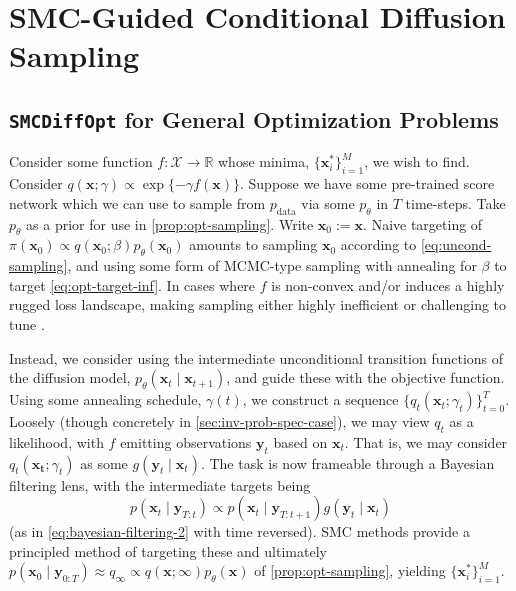 \chapter{SMC-Guided Conditional Diffusion Sampling} \label{chap:methods}

\section{\texttt{SMCDiffOpt} for General Optimization Problems} \label{sec:gen-opt}

Consider some function $f: \mathcal{X} \to \mathbb{R}$ whose minima, $\{\mathbf{x}^*_i\}_{i=1}^M$,
we wish to find. Consider $q(\mathbf{x}; \gamma) \propto \exp\{-\gamma f(\mathbf{x})\}$. Suppose we
have some pre-trained score network which we can use to sample from $p_{\text{data}}$ via some
$p_\theta$ in $T$ time-steps. Take $p_\theta$ as a prior for use in  \autoref{prop:opt-sampling}. Write
$\mathbf{x}_0 := \mathbf{x}$. Naive targeting of
$\pi(\mathbf{x}_0) \propto q(\mathbf{x}_0; \beta)p_\theta(\mathbf{x}_0)$ amounts to sampling
$\mathbf{x}_0$ according to \autoref{eq:uncond-sampling}, and using some form of MCMC-type sampling with
annealing for $\beta$ to target \autoref{eq:opt-target-inf}. In cases where $f$ is non-convex and/or
induces a highly rugged loss landscape, making sampling either highly inefficient or challenging
to tune \parencite{kongDiffusionModelsConstrained2024}.

Instead, we consider using the intermediate unconditional transition functions of the diffusion
model, $p_\theta(\mathbf{x}_{t} \mid \mathbf{x}_{t+1})$, and guide these with the objective
function. Using some annealing schedule, $\gamma(t)$, we construct a sequence
$\{q_t(\mathbf{x}_t; \gamma_t)\}_{t=0}^T$. Loosely (though concretely in
\autoref{sec:inv-prob-spec-case}), we may view $q_t$ as a likelihood, with $f$ emitting observations
$\mathbf{y}_t$ based on $\mathbf{x}_t$. That is, we may consider $q_t(\mathbf{x_t}; \gamma_t)$
as some $g(\mathbf{y}_t \mid \mathbf{x}_t)$. The task is now frameable through a Bayesian filtering
lens, with the intermediate targets being
\begin{equation}
    p(\mathbf{x}_t \mid \mathbf{y}_{T:t}) \propto p(\mathbf{x}_t \mid \mathbf{y}_{T:t+1})g(\mathbf{y}_t \mid \mathbf{x}_t)
\end{equation}
(as in \autoref{eq:bayesian-filtering-2} with time reversed). SMC methods provide a principled
method of targeting these and ultimately
$p(\mathbf{x}_0 \mid \mathbf{y}_{0:T}) \approx q_\infty \propto q(\mathbf{x}; \infty)p_\theta(\mathbf{x})$
of \autoref{prop:opt-sampling}, yielding $\{\mathbf{x}^*_i\}_{i=1}^M$.

